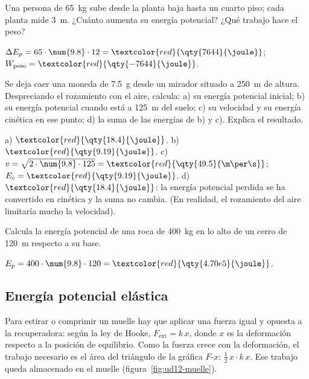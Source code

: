 \begin{exercise}
    Una persona de \qty{65}{\kg} sube desde la planta baja hasta un cuarto piso; cada planta mide \qty{3}{\m}. ¿Cuánto aumenta su
    energía potencial? ¿Qué trabajo hace el peso?
    \begin{solu}
        \(\Delta E_p = 65 \cdot \num{9.8} \cdot 12 = \textcolor{red}{\qty{7644}{\joule}}\); \(W_{\text{peso}} = \textcolor{red}{\qty{-7644}{\joule}}\).
    \end{solu}
\end{exercise}

\begin{exercise}
    Se deja caer una moneda de \qty{7.5}{\g} desde un mirador situado a \qty{250}{\m} de altura. Despreciando el rozamiento con el
    aire, calcula: a) su energía potencial inicial; b) su energía potencial cuando está a \qty{125}{\m} del suelo; c) su velocidad y su
    energía cinética en ese punto; d) la suma de las energías de b) y c). Explica el resultado.
    \begin{solu}
        a) \(\textcolor{red}{\qty{18.4}{\joule}}\). b) \(\textcolor{red}{\qty{9.19}{\joule}}\). c) \(v = \sqrt{2 \cdot \num{9.8} \cdot 125}
        = \textcolor{red}{\qty{49.5}{\m\per\s}}\); \(E_c = \textcolor{red}{\qty{9.19}{\joule}}\). d) \(\textcolor{red}{\qty{18.4}{\joule}}\):
        la energía potencial perdida se ha convertido en cinética y la suma no cambia. (En realidad, el rozamiento del aire limitaría
        mucho la velocidad).
    \end{solu}
\end{exercise}

\begin{exercise}
    Calcula la energía potencial de una roca de \qty{400}{\kg} en lo alto de un cerro de \qty{120}{\m} respecto a su base.
    \begin{solu}
        \(E_p = 400 \cdot \num{9.8} \cdot 120 = \textcolor{red}{\qty{4.70e5}{\joule}}\).
    \end{solu}
\end{exercise}

\subsection{Energía potencial elástica}

Para estirar o comprimir un muelle hay que aplicar una fuerza igual y opuesta a la recuperadora: según la ley de Hooke,
\(F_{\text{ext}} = k\,x\), donde \(x\) es la deformación respecto a la posición de equilibrio. Como la fuerza crece con la deformación,
el trabajo necesario es el área del triángulo de la gráfica \(F\)-\(x\): \(\frac{1}{2}\,x \cdot k\,x\). Ese trabajo queda
almacenado en el muelle (figura~\ref{fig:ud12-muelle}).

